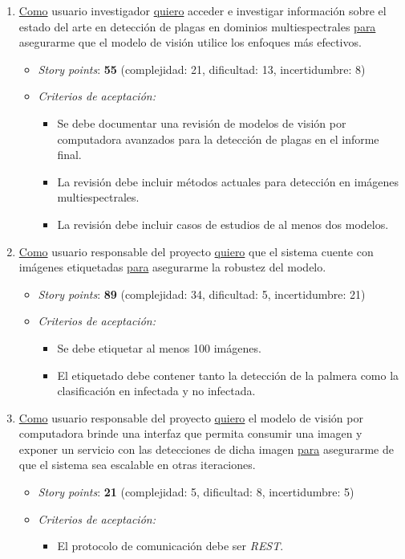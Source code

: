 \documentclass[
11pt, %
]{charter}
\begin{document}
\begin{enumerate}
  \item \underline{Como} usuario investigador \underline{quiero} acceder e investigar información sobre el estado del arte en detección de plagas en dominios multiespectrales \underline{para} asegurarme que el modelo de visión utilice los enfoques más efectivos.
        \begin{itemize}
          \item \textit{Story points}: \textbf{55} (complejidad: 21, dificultad: 13, incertidumbre: 8)
          \item \textit{Criterios de aceptación:}
                \begin{itemize}
                  \item Se debe documentar una revisión de modelos de visión por computadora avanzados para la detección de plagas en el informe final.
                  \item La revisión debe incluir métodos actuales para detección en imágenes multiespectrales.
                  \item La revisión debe incluir casos de estudios de al menos dos modelos.
                \end{itemize}
        \end{itemize}

  \item \underline{Como} usuario responsable del proyecto \underline{quiero} que el sistema cuente con imágenes etiquetadas \underline{para} asegurarme la robustez del modelo.
        \begin{itemize}
          \item \textit{Story points}: \textbf{89} (complejidad: 34, dificultad: 5, incertidumbre: 21)
          \item \textit{Criterios de aceptación:}
                \begin{itemize}
                  \item Se debe etiquetar al menos 100 imágenes.
                  \item El etiquetado debe contener tanto la detección de la palmera como la clasificación en infectada y no infectada.
                \end{itemize}
        \end{itemize}

  \item \underline{Como} usuario responsable del proyecto \underline{quiero} el modelo de visión por computadora brinde una interfaz que permita consumir una imagen y exponer un servicio con las detecciones de dicha imagen \underline{para} asegurarme de que el sistema sea escalable en otras iteraciones.
        \begin{itemize}
          \item \textit{Story points}: \textbf{21} (complejidad: 5, dificultad: 8, incertidumbre: 5)
          \item \textit{Criterios de aceptación:}
                \begin{itemize}
                  \item El protocolo de comunicación debe ser \textit{REST}.
                \end{itemize}
        \end{itemize}


\end{enumerate}
\end{document}
